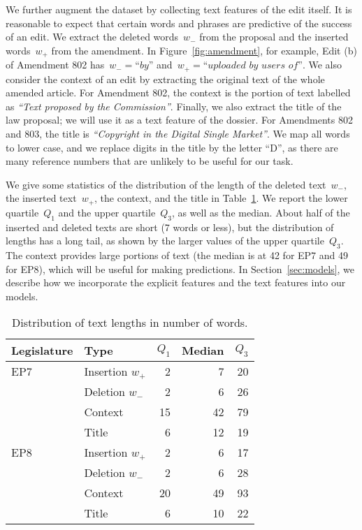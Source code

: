 We further augment the dataset by collecting text features of the edit itself.
It is reasonable to expect that certain words and phrases are predictive of the success of an edit.
We extract the deleted words~$w_-$ from the proposal and the inserted words~$w_+$ from  the amendment.
In Figure~\ref{fig:amendment}, for example, Edit (b) of Amendment 802 has~$w_- = \textit{``by''}$ and~$w_+ = \textit{``uploaded by users of''}$.
We also consider the context of an edit by extracting the original text of the whole amended article.
For Amendment 802, the context is the portion of text labelled as \textit{``Text proposed by the Commission''}.
Finally, we also extract the title of the law proposal; we will use it as a text feature of the dossier.
For Amendments 802 and 803, the title is \textit{``Copyright in the Digital Single Market''}.
We map all words to lower case, and we replace digits in the title by the letter ``D'', as there are many reference numbers that are unlikely to be useful for our task.

We give some statistics of the distribution of the length of the deleted text~$w_-$, the inserted text~$w_+$, the context, and the title in Table~\ref{tab:text}.
We report the lower quartile~$Q_1$ and the upper quartile~$Q_3$, as well as the median.
About half of the inserted and deleted texts are short (7 words or less), but the distribution of lengths has a long tail, as shown by the larger values of the upper quartile~$Q_3$.
The context provides large portions of text (the median is at 42 for EP7 and 49 for EP8), which will be useful for making predictions.
In Section~\ref{sec:models}, we describe how we incorporate the explicit features and the text features into our models.

\begin{table}
  \centering
	\caption{Distribution of text lengths in number of words.}
	\label{tab:text}
	\begin{tabular}{llrrr}
		\toprule
		Legislature & Type            & $Q_1$ & Median & $Q_3$ \\
		\midrule
		EP7         & Insertion $w_+$ & 2     & 7      & 20    \\
		            & Deletion $w_-$  & 2     & 6      & 26    \\
		            & Context         & 15    & 42     & 79    \\
		            & Title           & 6     & 12     & 19    \\
		EP8         & Insertion $w_+$ & 2     & 6      & 17    \\
		            & Deletion $w_-$  & 2     & 6      & 28    \\
		            & Context         & 20    & 49     & 93    \\
		            & Title           & 6     & 10     & 22    \\
		\bottomrule
	\end{tabular}
\end{table}

